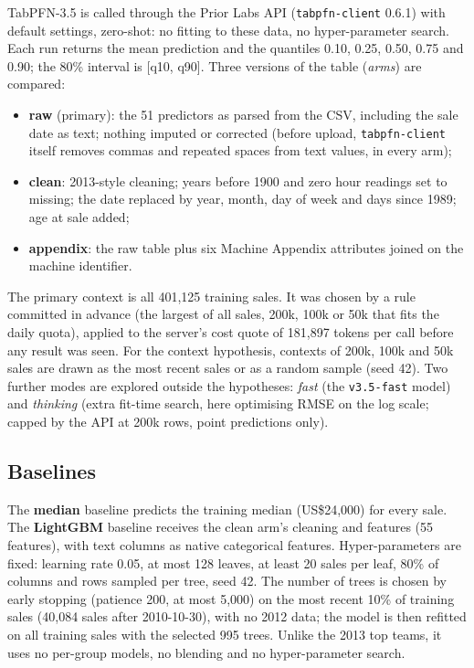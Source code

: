 \documentclass[11pt,a4paper]{article}
\begin{document}
TabPFN-3.5 is called through the Prior Labs API (\texttt{tabpfn-client} 0.6.1) with default settings, zero-shot: no fitting to these data, no hyper-parameter search. Each run returns the mean prediction and the quantiles 0.10, 0.25, 0.50, 0.75 and 0.90; the 80\% interval is [q10, q90]. Three versions of the table (\emph{arms}) are compared:
\begin{itemize}
\item \textbf{raw} (primary): the 51 predictors as parsed from the CSV, including the sale date as text; nothing imputed or corrected (before upload, \texttt{tabpfn-client} itself removes commas and repeated spaces from text values, in every arm);
\item \textbf{clean}: 2013-style cleaning; years before 1900 and zero hour readings set to missing; the date replaced by year, month, day of week and days since 1989; age at sale added;
\item \textbf{appendix}: the raw table plus six Machine Appendix attributes joined on the machine identifier.
\end{itemize}
The primary context is all 401,125 training sales. It was chosen by a rule committed in advance (the largest of all sales, 200k, 100k or 50k that fits the daily quota), applied to the server's cost quote of 181,897 tokens per call before any result was seen. For the context hypothesis, contexts of 200k, 100k and 50k sales are drawn as the most recent sales or as a random sample (seed 42). Two further modes are explored outside the hypotheses: \emph{fast} (the \texttt{v3.5-fast} model) and \emph{thinking} (extra fit-time search, here optimising RMSE on the log scale; capped by the API at 200k rows, point predictions only).

\subsection{Baselines}

The \textbf{median} baseline predicts the training median (US\$24,000) for every sale. The \textbf{LightGBM} baseline \cite{ke2017} receives the clean arm's cleaning and features (55 features), with text columns as native categorical features. Hyper-parameters are fixed: learning rate 0.05, at most 128 leaves, at least 20 sales per leaf, 80\% of columns and rows sampled per tree, seed 42. The number of trees is chosen by early stopping (patience 200, at most 5,000) on the most recent 10\% of training sales (40,084 sales after 2010-10-30), with no 2012 data; the model is then refitted on all training sales with the selected 995 trees. Unlike the 2013 top teams, it uses no per-group models, no blending and no hyper-parameter search.
\end{document}
